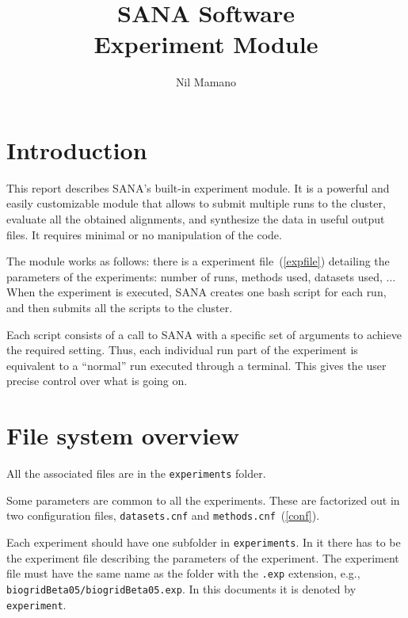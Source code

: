 \documentclass[]{article}
\title{SANA Software\\Experiment Module}
\author{Nil Mamano}
\begin{document}
\maketitle

\section{Introduction}
This report describes SANA's built-in experiment module. It is a powerful and easily customizable module that allows to submit multiple runs to the cluster, evaluate all the obtained alignments, and synthesize the data in useful output files. It requires minimal or no manipulation of the code.

The module works as follows: there is a experiment file~(\ref{expfile}) detailing the parameters of the experiments: number of runs, methods used, datasets used, ... When the experiment is executed, SANA creates one bash script for each run, and then submits all the scripts to the cluster.

Each script consists of a call to SANA with a specific set of arguments to achieve the required setting. Thus, each individual run part of the experiment is equivalent to a ``normal'' run executed through a terminal. This gives the user precise control over what is going on.

\section{File system overview}

All the associated files are in the \verb|experiments| folder.

Some parameters are common to all the experiments. These are factorized out in two configuration files, \verb|datasets.cnf| and \verb|methods.cnf|~(\ref{conf}).

Each experiment should have one subfolder in \verb|experiments|. In it there has to be the experiment file describing the parameters of the experiment. The experiment file must have the same name as the folder with the \verb|.exp| extension, e.g., \verb|biogridBeta05/biogridBeta05.exp|. In this documents it is denoted by \verb|experiment|.
\end{document}

